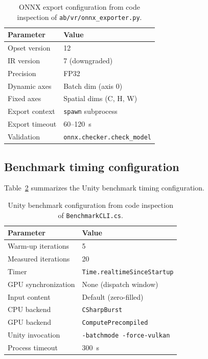 \documentclass[10pt,twocolumn,letterpaper]{article}
\begin{document}
\begin{table}[h]
\centering\small
\begin{tabular}{ll}
\toprule
Parameter & Value \\
\midrule
Opset version & 12 \\
IR version & 7 (downgraded) \\
Precision & FP32 \\
Dynamic axes & Batch dim (axis 0) \\
Fixed axes & Spatial dims (C, H, W) \\
Export context & \texttt{spawn} subprocess \\
Export timeout & 60--120~s \\
Validation & \texttt{onnx.checker.check\_model} \\
\bottomrule
\end{tabular}
\caption{ONNX export configuration from code inspection of \texttt{ab/vr/onnx\_exporter.py}.}
\label{tab:appendix_onnx}
\end{table}

\subsection{Benchmark timing configuration}

Table~\ref{tab:appendix_timing} summarizes the Unity benchmark timing configuration.

\begin{table}[h]
\centering\small
\begin{tabular}{ll}
\toprule
Parameter & Value \\
\midrule
Warm-up iterations & 5 \\
Measured iterations & 20 \\
Timer & \texttt{Time.realtimeSinceStartup} \\
GPU synchronization & None (dispatch window) \\
Input content & Default (zero-filled) \\
CPU backend & \texttt{CSharpBurst} \\
GPU backend & \texttt{ComputePrecompiled} \\
Unity invocation & \texttt{-batchmode -force-vulkan} \\
Process timeout & 300~s \\
\bottomrule
\end{tabular}
\caption{Unity benchmark configuration from code inspection of \texttt{BenchmarkCLI.cs}.}
\label{tab:appendix_timing}
\end{table}
\end{document}
